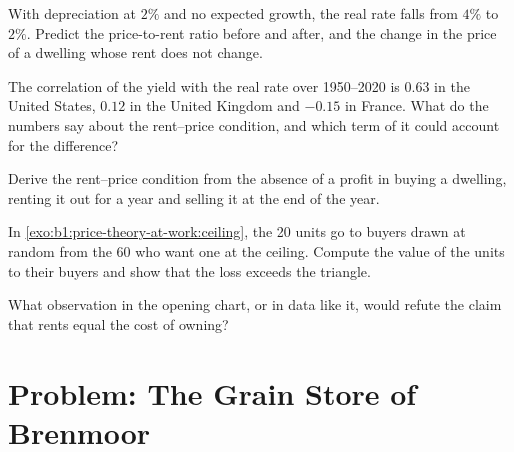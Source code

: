 \begin{exercise}[$\star\star$]\label{exo:b1:price-theory-at-work:rate-fall}
With depreciation at $2\%$ and no expected growth, the real rate falls from
$4\%$ to $2\%$. Predict the price-to-rent ratio before and after, and the change
in the price of a dwelling whose rent does not change.
\end{exercise}

\begin{exercise}[$\star\star$]\label{exo:b1:price-theory-at-work:corr}
The correlation of the yield with the real rate over 1950--2020 is $0.63$ in
the United States, $0.12$ in the United Kingdom and $-0.15$ in France.
What do the numbers say about the rent--price condition, and which term of
it could account for the difference?
\end{exercise}

\begin{exercise}[$\star\star\star$]\label{exo:b1:price-theory-at-work:derive}
Derive the rent--price condition from the absence of a profit in buying a
dwelling, renting it out for a year and selling it at the end of the year.
\end{exercise}

\begin{exercise}[$\star\star\star$]\label{exo:b1:price-theory-at-work:random}
In \cref{exo:b1:price-theory-at-work:ceiling}, the 20 units go to buyers
drawn at random from the 60 who want one at the ceiling. Compute the value
of the units to their buyers and show that the loss exceeds the triangle.
\end{exercise}

\begin{exercise}[$\star\star\star$]\label{exo:b1:price-theory-at-work:refute}
What observation in the opening chart, or in data like it, would refute
the claim that rents equal the cost of owning?
\end{exercise}

\section{Problem: The Grain Store of Brenmoor}\label{sec:b1:price-theory-at-work:problem}

